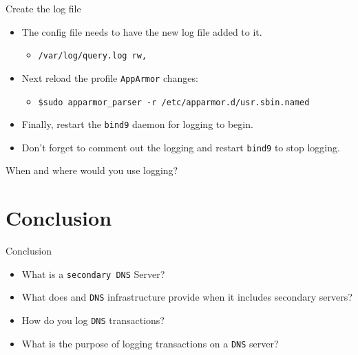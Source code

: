 \documentclass[xcolor=table]{beamer}
\begin{document}
\begin{frame}{Create the log file}
  \begin{itemize}
    \item The config file needs to have the new log file added to it.
      \begin{itemize}
        \item \texttt{/var/log/query.log rw,}
      \end{itemize}
    \item Next reload the profile \texttt{AppArmor} changes:
      \begin{itemize}
        \item \scriptsize\texttt{\$sudo apparmor\_parser -r /etc/apparmor.d/usr.sbin.named}
      \end{itemize}
    \item Finally, restart the \texttt{bind9} daemon for logging to begin.
    \item Don't forget to comment out the logging and restart \texttt{bind9} to stop logging.
  \end{itemize}
  \begin{tcolorbox}[title={\textbf{CONSIDER:}}]
    \begin{center}
      When and where would you use logging?
    \end{center}
\end{tcolorbox}
\end{frame}

\section*{Conclusion}
\begin{frame}{Conclusion}
  \begin{itemize}
    \item What is a \texttt{secondary DNS} Server?
    \item What does and \texttt{DNS} infrastructure provide when it includes secondary servers?
    \item How do you log \texttt{DNS} transactions?
    \item What is the purpose of logging transactions on a \texttt{DNS} server?
  \end{itemize}
\end{frame}
\end{document}
